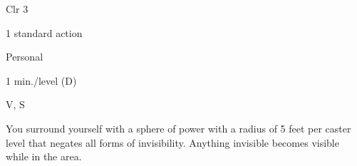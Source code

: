 
\begin{description*}
\item[Level:] Clr 3
\item[Casting Time:] 1 standard action
\item[Range:] Personal
\item[Duration:] 1 min./level (D)
\item[Components:] V, S
\end{description*}

You surround yourself with a sphere of power with a radius of 5 feet per caster
level that negates all forms of invisibility.
Anything invisible becomes visible while in the area.